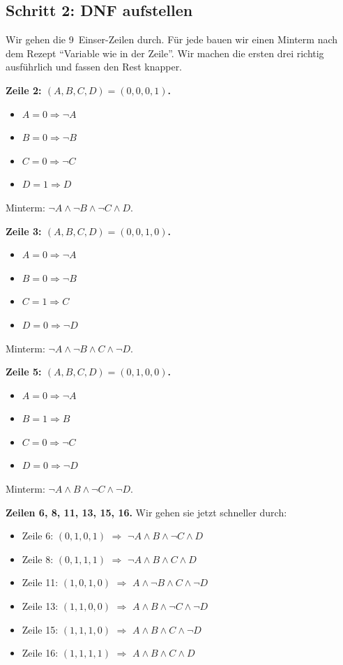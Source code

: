 \documentclass[a4paper,12pt]{article}
\begin{document}
\subsection*{Schritt 2: DNF aufstellen}

Wir gehen die 9~Einser-Zeilen durch. F\"ur jede bauen wir einen
Minterm nach dem Rezept "`Variable wie in der Zeile"'. Wir machen die
ersten drei richtig ausf\"uhrlich und fassen den Rest knapper.

\textbf{Zeile 2: $(A,B,C,D) = (0,0,0,1)$.}
\begin{itemize}[nosep]
\item $A = 0 \Rightarrow \neg A$
\item $B = 0 \Rightarrow \neg B$
\item $C = 0 \Rightarrow \neg C$
\item $D = 1 \Rightarrow D$
\end{itemize}
Minterm: $\neg A \wedge \neg B \wedge \neg C \wedge D$.

\textbf{Zeile 3: $(A,B,C,D) = (0,0,1,0)$.}
\begin{itemize}[nosep]
\item $A = 0 \Rightarrow \neg A$
\item $B = 0 \Rightarrow \neg B$
\item $C = 1 \Rightarrow C$
\item $D = 0 \Rightarrow \neg D$
\end{itemize}
Minterm: $\neg A \wedge \neg B \wedge C \wedge \neg D$.

\textbf{Zeile 5: $(A,B,C,D) = (0,1,0,0)$.}
\begin{itemize}[nosep]
\item $A = 0 \Rightarrow \neg A$
\item $B = 1 \Rightarrow B$
\item $C = 0 \Rightarrow \neg C$
\item $D = 0 \Rightarrow \neg D$
\end{itemize}
Minterm: $\neg A \wedge B \wedge \neg C \wedge \neg D$.

\textbf{Zeilen 6, 8, 11, 13, 15, 16.} Wir gehen sie jetzt schneller
durch:
\begin{itemize}[nosep]
\item Zeile 6: $(0,1,0,1)$ $\Rightarrow$ $\neg A \wedge B \wedge \neg C \wedge D$
\item Zeile 8: $(0,1,1,1)$ $\Rightarrow$ $\neg A \wedge B \wedge C \wedge D$
\item Zeile 11: $(1,0,1,0)$ $\Rightarrow$ $A \wedge \neg B \wedge C \wedge \neg D$
\item Zeile 13: $(1,1,0,0)$ $\Rightarrow$ $A \wedge B \wedge \neg C \wedge \neg D$
\item Zeile 15: $(1,1,1,0)$ $\Rightarrow$ $A \wedge B \wedge C \wedge \neg D$
\item Zeile 16: $(1,1,1,1)$ $\Rightarrow$ $A \wedge B \wedge C \wedge D$
\end{itemize}
\end{document}
